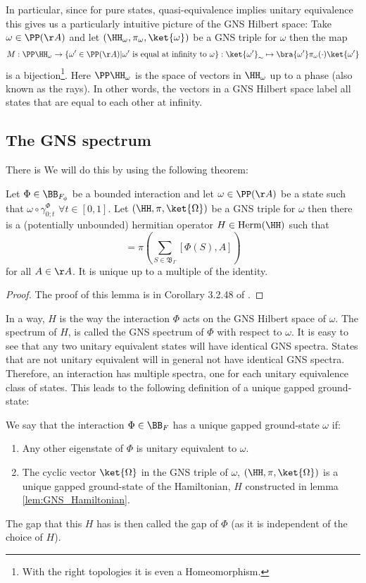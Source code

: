 In particular, since for pure states, quasi-equivalence implies unitary equivalence this gives us a particularly intuitive picture of the GNS Hilbert space: Take $\omega\in\PP(\AA)$ and let $(\HH_\omega,\pi_\omega,\ket{\omega})$ be a GNS triple for $\omega$ then the map
\begin{equation}
M:\PP\HH_\omega\rightarrow \{\omega'\in\PP(\AA)|\omega'\text{ is equal at infinity to }\omega\}:\ket{\omega'}_\sim\mapsto \bra{\omega'}\pi_\omega(\cdot)\ket{\omega'}
\end{equation}
is a bijection\footnote{With the right topologies it is even a Homeomorphism.}. Here $\PP\HH_\omega$ is the space of vectors in $\HH_\omega$ up to a phase (also known as the rays). In other words, the vectors in a GNS Hilbert space label all states that are equal to each other at infinity.
\subsection{The GNS spectrum}\label{sec:GNS_Spectrum}
There is  We will do this by using the following theorem:
\begin{lemma}\label{lem:GNS_Hamiltonian}
	Let $\Phi\in\BB_{F_\phi}$ be a bounded interaction and let $\omega\in\PP(\AA)$ be a state such that $\omega\circ\gamma^{\Phi}_{0;t}$ $\forall t\in[0,1]$. Let $(\HH,\pi,\ket{\Omega})$ be a GNS triple for $\omega$ then there is a (potentially unbounded) hermitian operator $H\in\textrm{Herm}(\HH)$ such that
	\begin{equation}
		[H,\pi(A)]=\pi\left(\sum_{S\in\mathfrak{B}_\Gamma}[\Phi(S),A]\right)
	\end{equation}
	for all $A\in\AA$. It is unique up to a multiple of the identity.
\end{lemma}
\begin{proof}
	The proof of this lemma is in Corollary 3.2.48 of \cite{bratteli1979operator}.
\end{proof}
In a way, $H$ is the way the interaction $\Phi$ acts on the GNS Hilbert space of $\omega$. The spectrum of $H$, is called the GNS spectrum of $\Phi$ with respect to $\omega$. It is easy to see that any two unitary equivalent states will have identical GNS spectra. States that are not unitary equivalent will in general not have identical GNS spectra. Therefore, an interaction has multiple spectra, one for each unitary equivalence class of states. This leads to the following definition of a unique gapped ground-state:
\begin{definition}\label{def:UniqueGappedGroundstate}
	We say that the interaction $\Phi\in\BB_F$ has a unique gapped ground-state $\omega$ if:
	\begin{enumerate}
		\item Any other eigenstate of $\Phi$ is unitary equivalent to $\omega$.
		\item The cyclic vector $\ket{\Omega}$ in the GNS triple of $\omega$, $(\HH,\pi,\ket{\Omega})$ is a unique gapped ground-state of the Hamiltonian, $H$ constructed in lemma \ref{lem:GNS_Hamiltonian}.
	\end{enumerate}
\end{definition}
The gap that this $H$ has is then called the gap of $\Phi$ (as it is independent of the choice of $H$).

